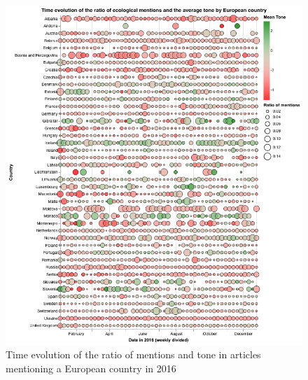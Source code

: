 \documentclass[a4paper]{article}
\begin{document}
\begin{figure}[h]
   \centering
   \includegraphics[scale=0.5]{timeline_europe_2016.png}
    \caption{\label{timeline_wide_2} Time evolution of the ratio of mentions and tone in articles mentioning a European country in 2016}
\end{figure}
\end{document}
